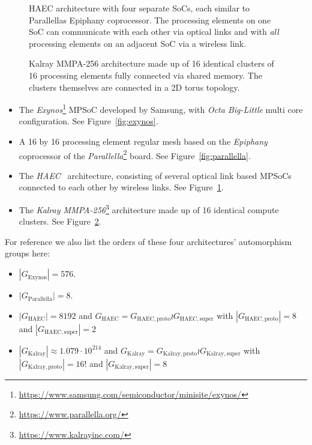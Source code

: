 \begin{figure}
  \centering
  \caption{HAEC architecture with four separate SoCs, each similar to
           Parallellas Epiphany coprocessor. The processing elements on one
           SoC can communicate with each other via optical links and with
           \textit{all} processing elements on an adjacent SoC via a wireless
           link.}
  \label{fig:haec}
\end{figure}

\begin{figure}
  \centering
  \caption{Kalray MMPA-256 architecture made up of 16 identical clusters of 16
           processing elements fully connected via shared memory. The clusters
           themselves are connected in a 2D torus topology.}
  \label{fig:kalray}
\end{figure}

\begin{itemize}
\item The
\textit{Exynos}\footnote{\hyperlink{https://www.samsung.com/semiconductor/minisite/exynos/}{https://www.samsung.com/semiconductor/minisite/exynos/}}
MPSoC developed by Samsung, with \textit{Octa Big-Little} multi core
configuration. See Figure~\ref{fig:exynos}.

\item A 16 by 16 processing element regular mesh based on the
\textit{Epiphany} \cite{Olofsson} coprocessor of the
\textit{Parallella}\footnote{\hyperlink{https://www.parallella.org/}{https://www.parallella.org/}}
board. See Figure~\ref{fig:parallella}.

\item The \textit{HAEC}~\cite{HAEC} architecture, consisting of several optical
link based MPSoCs connected to each other by wireless links. See
Figure~\ref{fig:haec}.

\item The \textit{Kalray
MMPA-256}\footnote{\hyperlink{https://www.kalrayinc.com/}{https://www.kalrayinc.com/}}
architecture made up of 16 identical compute clusters. See
Figure~\ref{fig:kalray}.
\end{itemize}
%
For reference we also list the orders of these four architectures' automorphism
groups here:
%
\begin{itemize}
\item $|G_{\mathrm{Exynos}}| = 576$.

\item $|G_{\mathrm{Parallella}}| = 8$.

\item $|G_{\mathrm{HAEC}}| = 8192$ and $G_{\mathrm{HAEC}} =
G_{\mathrm{HAEC,proto}} \wr G_{\mathrm{HAEC,super}}$ with
$|G_{\mathrm{HAEC,proto}}| = 8$ and $|G_{\mathrm{HAEC,super}}| = 2$

\item $|G_{\mathrm{Kalray}}| \approx 1.079 \cdot 10^{214}$ and
$G_{\mathrm{Kalray}} = G_{\mathrm{Kalray,proto}} \wr G_{\mathrm{Kalray,super}}$
with $|G_{\mathrm{Kalray,proto}}| = 16!$ and $|G_{\mathrm{Kalray,super}}| = 8$
\end{itemize}

